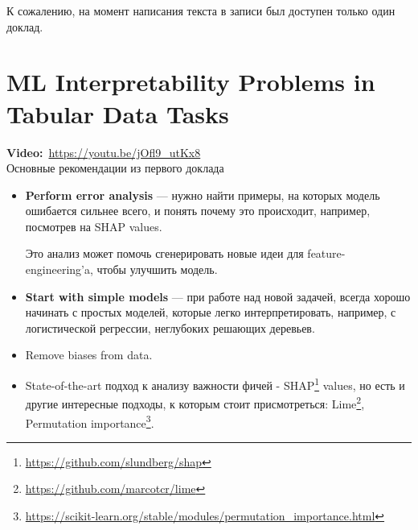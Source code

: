 К сожалению, на момент написания текста в записи был доступен только один доклад.

\section{ML Interpretability Problems in Tabular Data Tasks}

\textbf{Video:}~\url{https://youtu.be/jOfl9_utKx8} \\

Основные рекомендации из первого доклада

\begin{itemize}
    \item \textbf{Perform error analysis} --- нужно найти примеры, на которых модель ошибается сильнее всего, и понять почему это происходит, например, посмотрев на SHAP values.
    
    Это анализ может помочь сгенерировать новые идеи для feature-engineering'a, чтобы улучшить модель.
    
    \item \textbf{Start with simple models} --- при работе над новой задачей, всегда хорошо начинать с простых моделей, которые легко интерпретировать, например, с логистической регрессии, неглубоких решающих деревьев.
    
    \item Remove biases from data.
    
    \item State-of-the-art подход к анализу важности фичей - SHAP\footnote{\url{https://github.com/slundberg/shap}} values, но есть и другие интересные подходы, к которым стоит присмотреться: Lime\footnote{\url{https://github.com/marcotcr/lime}}, Permutation importance\footnote{\url{https://scikit-learn.org/stable/modules/permutation_importance.html}}.
    
\end{itemize}